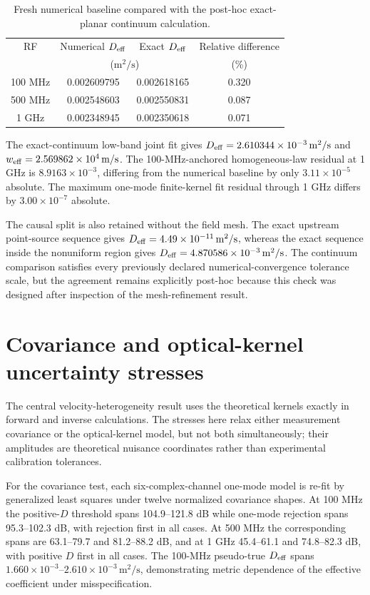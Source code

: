 \documentclass[aps,pra,onecolumn,superscriptaddress,nofootinbib]{revtex4-2}
\begin{document}
\begin{table}[h]
\caption{Fresh numerical baseline compared with the post-hoc exact-planar continuum calculation.}
\centering
\begin{tabular}{cccc}
\toprule
RF & Numerical $D_{\rm eff}$ & Exact $D_{\rm eff}$ & Relative difference\\
 & \multicolumn{2}{c}{($\mathrm{m^2/s}$)} & (\%)\\
\midrule
100 MHz & 0.002609795 & 0.002618165 & 0.320\\
500 MHz & 0.002548603 & 0.002550831 & 0.087\\
1 GHz   & 0.002348945 & 0.002350618 & 0.071\\
\bottomrule
\end{tabular}
\end{table}

The exact-continuum low-band joint fit gives $D_{\rm eff}=2.610344\times10^{-3}\,\mathrm{m^2/s}$ and $w_{\rm eff}=2.569862\times10^4\,\mathrm{m/s}$.  The 100-MHz-anchored homogeneous-law residual at 1 GHz is $8.9163\times10^{-3}$, differing from the numerical baseline by only $3.11\times10^{-5}$ absolute.  The maximum one-mode finite-kernel fit residual through 1 GHz differs by $3.00\times10^{-7}$ absolute.

The causal split is also retained without the field mesh.  The exact upstream point-source sequence gives $D_{\rm eff}=4.49\times10^{-11}\,\mathrm{m^2/s}$, whereas the exact sequence inside the nonuniform region gives $D_{\rm eff}=4.870586\times10^{-3}\,\mathrm{m^2/s}$.  The continuum comparison satisfies every previously declared numerical-convergence tolerance scale, but the agreement remains explicitly post-hoc because this check was designed after inspection of the mesh-refinement result.


\section{Covariance and optical-kernel uncertainty stresses}

The central velocity-heterogeneity result uses the theoretical kernels exactly in forward and inverse calculations. The stresses here relax either measurement covariance or the optical-kernel model, but not both simultaneously; their amplitudes are theoretical nuisance coordinates rather than experimental calibration tolerances.

For the covariance test, each six-complex-channel one-mode model is re-fit by generalized least squares under twelve normalized covariance shapes. At 100 MHz the positive-$D$ threshold spans 104.9--121.8 dB while one-mode rejection spans 95.3--102.3 dB, with rejection first in all cases. At 500 MHz the corresponding spans are 63.1--79.7 and 81.2--88.2 dB, and at 1 GHz 45.4--61.1 and 74.8--82.3 dB, with positive $D$ first in all cases. The 100-MHz pseudo-true $D_{\rm eff}$ spans $1.660\times10^{-3}$--$2.610\times10^{-3}\,\mathrm{m^2/s}$, demonstrating metric dependence of the effective coefficient under misspecification.
\end{document}
